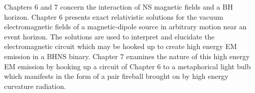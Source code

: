 Chapters 6 and 7 concern the interaction of NS magnetic fields and a BH
horizon. Chapter 6 presents exact relativistic solutions for the vacuum
electromagnetic fields of a magnetic-dipole source in arbitrary motion near an
event horizon. The solutions are used to interpret and elucidate the
electromagnetic circuit which may be hooked up to create high energy EM
emission in a BHNS binary. Chapter 7 examines the nature of this high energy EM emission by hooking up a circuit of Chapter 6 to a metaphorical light
bulb which manifests in the form of a pair fireball brought on by high energy
curvature radiation.

























